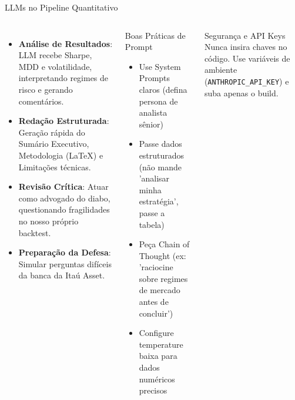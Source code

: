 \documentclass[aspectratio=169,12pt]{beamer}
\begin{document}
\begin{frame}[fragile]{LLMs no Pipeline Quantitativo}
\begin{columns}[T]
\begin{itemize}
  \item \textbf{Análise de Resultados}: LLM recebe Sharpe, MDD e volatilidade, interpretando regimes de risco e gerando comentários.
  \item \textbf{Redação Estruturada}: Geração rápida do Sumário Executivo, Metodologia (LaTeX) e Limitações técnicas.
  \item \textbf{Revisão Crítica}: Atuar como advogado do diabo, questionando fragilidades no nosso próprio backtest.
  \item \textbf{Preparação da Defesa}: Simular perguntas difíceis da banca da Itaú Asset.
\end{itemize}
\begin{block}{Boas Práticas de Prompt}
\begin{itemize}
  \item Use System Prompts claros (defina persona de analista sênior)
  \item Passe dados estruturados (não mande 'analisar minha estratégia', passe a tabela)
  \item Peça Chain of Thought (ex: 'raciocine sobre regimes de mercado antes de concluir')
  \item Configure temperature baixa para dados numéricos precisos
\end{itemize}
\end{block}\vspace{.2em}
\begin{alertblock}{Segurança e API Keys}
Nunca insira chaves no código. Use variáveis de ambiente (\texttt{ANTHROPIC\_API\_KEY}) e suba apenas o build.
\end{alertblock}
\end{columns}
\end{frame}
\end{document}
